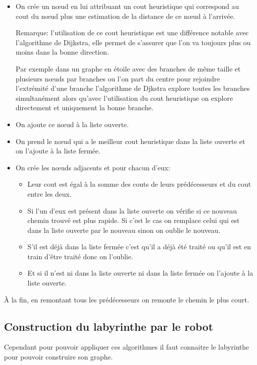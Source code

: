     \begin{itemize}
      \item On crée un nœud en lui attribuant un cout heuristique qui
        correspond au cout du nœud plus une estimation de la distance de ce
        nœud à l'arrivée.

        Remarque: l'utilisation de ce cout heuristique est une différence
        notable avec l'algorithme de Dijkstra, elle permet de s'assurer que
        l'on va toujours plus ou moins dans la bonne direction.

        Par exemple dans un graphe en étoile avec des branches de même taille
        et plusieurs nœuds par branches ou l'on part du centre pour rejoindre
        l'extrémité d'une branche l'algorithme de Djkstra explore toutes les
        branches simultanément alors qu'avec l'utilisation du cout heuristique
        on explore directement et uniquement la bonne branche.
      \item On ajoute ce nœud à la liste ouverte.
      \item On prend le nœud qui a le meilleur cout heuristique dans la liste
        ouverte et on l'ajoute à la liste fermée.
      \item On crée les nœuds adjacents et pour chacun d'eux:
        \begin{itemize}
          \item Leur cout est égal à la somme des couts de leurs prédécesseurs
            et du cout entre les deux.
          \item Si l'un d'eux est présent dans la liste ouverte on vérifie si
            ce nouveau chemin trouvé est plus rapide. Si c'est le cas on
            remplace celui qui est dans la liste ouverte par le nouveau sinon
            on oublie le nouveau.
          \item S'il est déjà dans la liste fermée c'est qu'il a déjà été
            traité ou qu'il est en train d'être traité donc on l'oublie.
          \item Et si il n'est ni dans la liste ouverte ni dans la liste fermée
            on l'ajoute à la liste ouverte.
        \end{itemize}
    \end{itemize}
	
    À la fin, en remontant tous les prédécesseurs on remonte le chemin le plus
    court.

  \subsection{Construction du labyrinthe par le robot}
    Cependant pour pouvoir appliquer ces algorithmes il faut connaitre le
    labyrinthe pour pouvoir construire son graphe.

